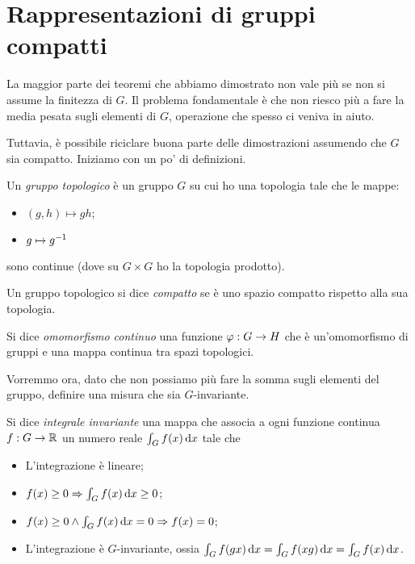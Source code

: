 \section{Rappresentazioni di gruppi compatti}
	\newcommand{\SU}[1]{SU(#1)}
	\newcommand{\SO}[1]{SO(#1)}
	\newcommand{\twomatrix}[4]{
	\left(
		\begin{matrix}
			#1 & #2 \\
			#3 & #4					
		\end{matrix}
	\right)
	}
	La maggior parte dei teoremi che abbiamo dimostrato non vale più se non si assume la finitezza di $G$. Il problema fondamentale è che non riesco più a fare la media pesata sugli elementi di $G$, operazione che spesso ci veniva in aiuto.
	
	Tuttavia, è possibile riciclare buona parte delle dimostrazioni assumendo che $G$ sia compatto. Iniziamo con un po' di definizioni.
	
	\begin{mydef}
		Un \emph{gruppo topologico} è un gruppo $G$ su cui ho una topologia tale che le mappe:
		\begin{itemize}
		 \item $(g,h) \mapsto gh$;
		 \item $g \mapsto g^{-1}$
		\end{itemize}
		sono continue (dove su $G\times G$ ho la topologia prodotto).
	\end{mydef}
	
	\begin{mydef}
		Un gruppo topologico si dice \emph{compatto} se è uno spazio compatto rispetto alla sua topologia.
	\end{mydef}
	
	\begin{mydef}
		Si dice \emph{omomorfismo continuo} una funzione $\varphi: G\rightarrow H$ che è un'omomorfismo di gruppi e una mappa continua tra spazi topologici.  
	\end{mydef}

	Vorremmo ora, dato che non possiamo più fare la somma sugli elementi del gruppo, definire una misura che sia $G$-invariante. 
	\begin{mydef}
		Si dice \emph{integrale invariante} una mappa che associa a ogni funzione continua $f: G \rightarrow \mathbb R$ un numero reale $\int_G f(x) \, \textrm{d} x$ tale che 
		\begin{itemize}
		 \item L'integrazione è lineare;
		 \item $f(x)\ge 0 \Rightarrow \int_{G} f(x) \, \textrm{d} x \ge 0$;
		 \item $f(x)\ge 0 \wedge \int_{G} f(x) \, \textrm{d} x = 0 \Rightarrow f(x)=0$; 
		 \item L'integrazione è $G$-invariante, ossia $\int_{G} f(gx) \, \textrm{d} x=\int_{G} f(xg) \, \textrm{d} x=\int_{G} f(x) \, \textrm{d} x$.
		\end{itemize}
	\end{mydef}
	
